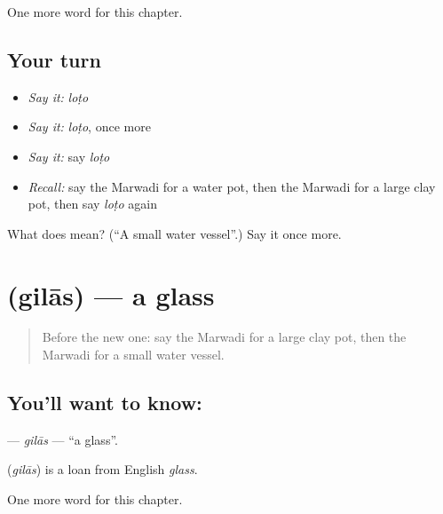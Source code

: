 \begin{grammarlens}[title={What you've built}]
One more word for this chapter.
\end{grammarlens}

\subsection*{Your turn}
\begin{itemize}
\raggedright
  \item \emph{Say it:} \emph{loṭo}
  \item \emph{Say it:} \emph{loṭo}, once more
  \item \emph{Say it:} say \emph{loṭo}
  \item \emph{Recall:} say the Marwadi for a water pot, then the Marwadi for a large clay pot, then say \emph{loṭo} again
\end{itemize}

\begin{tcolorbox}[breakable,colback=teal!4,colframe=teal!35!black,title={Before you move on}]
What does  mean? (\textquotedblleft{}A small water vessel\textquotedblright{}.) Say it once more.
\end{tcolorbox}
\section[\texorpdfstring{\mw{गिलास} (gilās)}{गिलास (gilās)}]{ (gilās) — a glass}

\label{lesson:MW-C119-gilas}



\begin{quote}
Before the new one: say the Marwadi for a large clay pot, then the Marwadi for a small water vessel.
\end{quote}

\subsection*{You'll want to know: }
\textbf{} — \emph{gilās} — \textquotedblleft{}a glass\textquotedblright{}.

\begin{cousinweb}
\textbf{} (\emph{gilās}) is a loan from English \emph{glass}.
\end{cousinweb}

\begin{grammarlens}[title={What you've built}]
One more word for this chapter.
\end{grammarlens}

